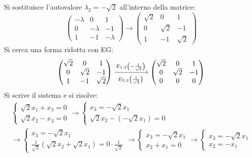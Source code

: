 \documentclass[a4paper]{article}
\makeatletter
\newenvironment{rowequmat}[1]{\left(\array{@{}#1@{}}}{\endarray\right)}
\makeatother
\begin{document}
	\noindent
	Si sostituisce l'autovalore $\lambda_{2} = -\sqrt{2}$ all'interno della matrice:
	\begin{equation*}
		\begin{pmatrix}
			-\lambda & 0 & 1 \\
			0 & -\lambda & -1 \\
			1 & -1 & -\lambda
		\end{pmatrix}
		\longrightarrow
		\begin{pmatrix}
			\sqrt{2} & 0 & 1 \\
			0 & \sqrt{2} & -1 \\
			1 & -1 & \sqrt{2}
		\end{pmatrix}
	\end{equation*}
	Si cerca una forma ridotta con EG:
	\begin{equation*}
		\begin{pmatrix}
			\sqrt{2} & 0 & 1 \\
			0 & \sqrt{2} & -1 \\
			1 & -1 & \sqrt{2}
		\end{pmatrix}
		\xlongrightarrow[E_{2,3}\left(\frac{1}{\sqrt{2}}\right)]{E_{1,3}\left(-\frac{1}{\sqrt{2}}\right)}
		\begin{rowequmat}{ccc}
			\sqrt{2} & 0 & 1 \\ 
			0 & \sqrt{2} & -1 \\ 
			0 & 0 & 0
		\end{rowequmat}
	\end{equation*}
	Si scrive il sistema e si risolve:
	\begin{gather*}
		\begin{cases}
			\sqrt{2}x_{1} + x_{3} = 0 \\
			\sqrt{2}x_{2} - x_{3} = 0
		\end{cases}
		\longrightarrow
		\begin{cases}
			x_{3} = -\sqrt{2}x_{1} \\
			\sqrt{2}x_{2} - \left(-\sqrt{2}x_{1}\right) = 0
		\end{cases} \\
		\longrightarrow
		\begin{cases}
			x_{3} = -\sqrt{2}x_{1} \\
			\frac{1}{\sqrt{2}} \left(\sqrt{2}x_{2} + \sqrt{2}x_{1}\right) = 0 \cdot \frac{1}{\sqrt{2}}
		\end{cases}
		\longrightarrow
		\begin{cases}
			x_{3} = -\sqrt{2}x_{1} \\
			x_{2} + x_{1} = 0
		\end{cases}
		\longrightarrow
		\begin{cases}
			x_{3} = -\sqrt{2}x_{1} \\
			x_{2} = -x_{1}
		\end{cases}
	\end{gather*}
\end{document}
